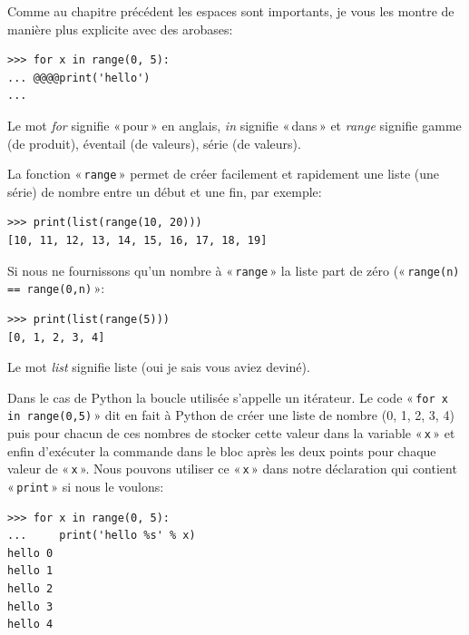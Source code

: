 Comme au chapitre précédent les espaces sont importants, je vous les montre de manière plus explicite avec des arobases:

\begin{Verbatim}[frame=single,rulecolor=\color{gray}, label=ne pas saisir]
>>> for x in range(0, 5):
... @@@@print('hello')
...
\end{Verbatim}

Le mot \emph{for} signifie « pour »  en anglais, \emph{in} signifie « dans » et \emph{range} signifie gamme (de produit), éventail (de valeurs), série (de valeurs).

La fonction « \texttt{range} » permet de créer facilement et rapidement une liste (une série) de nombre entre un début et une fin, par exemple:

\begin{Verbatim}[frame=single,rulecolor=\color{mbleu}, label=à taper]
>>> print(list(range(10, 20)))
[10, 11, 12, 13, 14, 15, 16, 17, 18, 19]
\end{Verbatim}

Si nous ne fournissons qu'un nombre à « \texttt{range} » la liste part de zéro (« \texttt{range(n) == range(0,n)} »:

\begin{Verbatim}[frame=single,rulecolor=\color{mbleu}, label=à taper]
>>> print(list(range(5)))
[0, 1, 2, 3, 4]
\end{Verbatim}

Le mot \emph{list} signifie liste (oui je sais vous aviez deviné).

Dans le cas de Python la boucle utilisée s'appelle un itérateur. Le code « \texttt{for x in range(0,5)} » dit en fait à Python de créer une liste de nombre (0, 1, 2, 3, 4) puis pour chacun de ces nombres de stocker cette valeur dans la variable « \texttt{x} » et enfin d'exécuter la commande dans le bloc après les deux points pour chaque valeur de « \texttt{x} ». Nous pouvons utiliser ce « \texttt{x} »  dans notre déclaration qui contient « \texttt{print} » si nous le voulons:

\begin{Verbatim}[frame=single,rulecolor=\color{green}, label=à taper avec attention]
>>> for x in range(0, 5):
...     print('hello %s' % x)
hello 0
hello 1
hello 2
hello 3
hello 4
\end{Verbatim}

